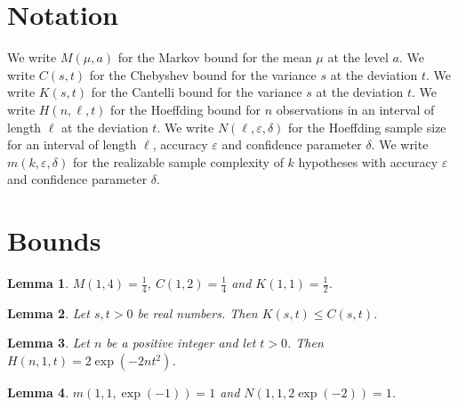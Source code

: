 \documentclass{article}
\newtheorem{lemma}{Lemma}
\begin{document}
\section{Notation}

We write $M(\mu,a)$ for the Markov bound for the mean $\mu$ at the level $a$.
We write $C(s,t)$ for the Chebyshev bound for the variance $s$ at the deviation $t$.
We write $K(s,t)$ for the Cantelli bound for the variance $s$ at the deviation $t$.
We write $H(n,\ell,t)$ for the Hoeffding bound for $n$ observations in an interval of length $\ell$ at the deviation $t$.
We write $N(\ell,\varepsilon,\delta)$ for the Hoeffding sample size for an interval of length $\ell$, accuracy $\varepsilon$ and confidence parameter $\delta$.
We write $m(k,\varepsilon,\delta)$ for the realizable sample complexity of $k$ hypotheses with accuracy $\varepsilon$ and confidence parameter $\delta$.

\section{Bounds}

\begin{lemma}\label{values}
$M(1,4)=\frac14$, $C(1,2)=\frac14$ and $K(1,1)=\frac12$.
\end{lemma}

\begin{lemma}\label{cantelli}
Let $s,t>0$ be real numbers. Then $K(s,t)\le C(s,t)$.
\end{lemma}

\begin{lemma}\label{hoeffding}
Let $n$ be a positive integer and let $t>0$. Then $H(n,1,t)=2\exp(-2nt^2)$.
\end{lemma}

\begin{lemma}\label{samples}
$m(1,1,\exp(-1))=1$ and $N(1,1,2\exp(-2))=1$.
\end{lemma}
\end{document}
